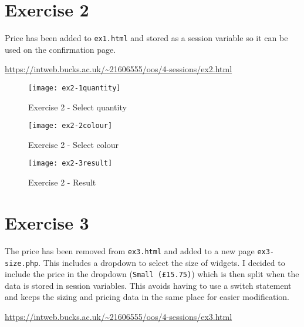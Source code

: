 \section{Exercise 2}

Price has been added to \texttt{ex1.html} and stored as a session variable so it can be used on the confirmation page.

\url{https://intweb.bucks.ac.uk/~21606555/oos/4-sessions/ex2.html}

\captionsetup{type=figure}


\clearpage
\captionsetup{type=figure}


\captionsetup{type=figure}


\begin{figure}[H]
  \caption{Exercise 2 - Select quantity}
  \centering
  \texttt{[image: ex2-1quantity]}
\end{figure}

\begin{figure}[H]
  \caption{Exercise 2 - Select colour}
  \centering
  \texttt{[image: ex2-2colour]}
\end{figure}

\begin{figure}[H]
  \caption{Exercise 2 - Result}
  \centering
  \texttt{[image: ex2-3result]}
\end{figure}

\clearpage
\section{Exercise 3}

The price has been removed from \texttt{ex3.html} and added to a new page \texttt{ex3-size.php}. This includes a dropdown to select the size of widgets. I decided to include the price in the dropdown (\texttt{Small (£15.75)}) which is then split when the data is stored in session variables. This avoids having to use a switch statement and keeps the sizing and pricing data in the same place for easier modification.

\url{https://intweb.bucks.ac.uk/~21606555/oos/4-sessions/ex3.html}

\captionsetup{type=figure}


